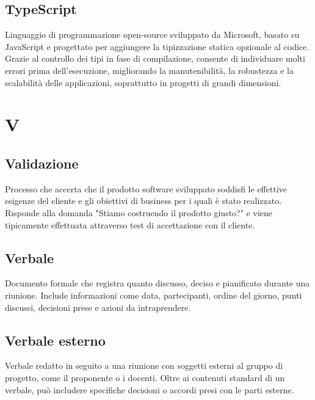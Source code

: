 \documentclass[a4paper,11pt]{article}
\begin{document}
\subsection{TypeScript}
Linguaggio di programmazione open-source sviluppato da Microsoft, basato su JavaScript e progettato per aggiungere la tipizzazione statica opzionale al codice. Grazie al controllo dei tipi in fase di compilazione, consente di individuare molti errori prima dell’esecuzione, migliorando la manutenibilità, la robustezza e la scalabilità delle applicazioni, soprattutto in progetti di grandi dimensioni.


\newpage




\section{V}

\subsection{Validazione}
Processo che accerta che il prodotto software sviluppato soddisfi le effettive esigenze del cliente e gli obiettivi di business per i quali è stato realizzato. Risponde alla domanda "Stiamo costruendo il prodotto giusto?" e viene tipicamente effettuata attraverso test di accettazione con il cliente.









\subsection{Verbale}
Documento formale che registra quanto discusso, deciso e pianificato durante una riunione. Include informazioni come data, partecipanti, ordine del giorno, punti discussi, decisioni prese e azioni da intraprendere.









\subsection{Verbale esterno}
Verbale redatto in seguito a una riunione con soggetti esterni al gruppo di progetto, come il proponente o i docenti. Oltre ai contenuti standard di un verbale, può includere specifiche decisioni o accordi presi con le parti esterne.
\end{document}

